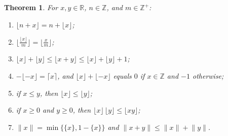 \documentclass[11pt]{article}
\theoremstyle{ntstyle}
\newtheorem{theorem}{Theorem}[subsection]
\begin{document}
\begin{theorem}\label{thm:4.3.1} For
	$x, y\in\mathbb{R}$, $n\in\mathbb{Z}$, and $m\in\mathbb{Z}^+$:

	\begin{enumerate}[label={\alph*)}]
		\item $\lfloor n+x\rfloor = n + \lfloor x\rfloor$;
		\item $\big\lfloor \tfrac{\lfloor x\rfloor}{m}\big\rfloor =
						\big\lfloor \tfrac{x}{m}\big\rfloor$;
		\item $\lfloor x\rfloor + \lfloor y\rfloor \le \lfloor x+y\rfloor
						\le \lfloor x\rfloor + \lfloor y\rfloor + 1$;
		\item $-\lfloor -x\rfloor = \lceil x\rceil$, and $\lfloor x\rfloor
						+ \lfloor -x\rfloor$ equals $0$ if $x\in\mathbb{Z}$ and $-1$ otherwise;
		\item if $x\le y$, then $\lfloor x\rfloor \le \lfloor y\rfloor$;
		\item if $x\ge0$ and $y\ge0$, then $\lfloor x\rfloor\,\lfloor y\rfloor
						\le \lfloor xy\rfloor$;
		\item $\lVert x\rVert = \min\{\{x\}, 1-\{x\}\}$ and $\lVert
						x+y\rVert \le \lVert x\rVert + \lVert y\rVert$.
	\end{enumerate}
\end{theorem}
\end{document}
